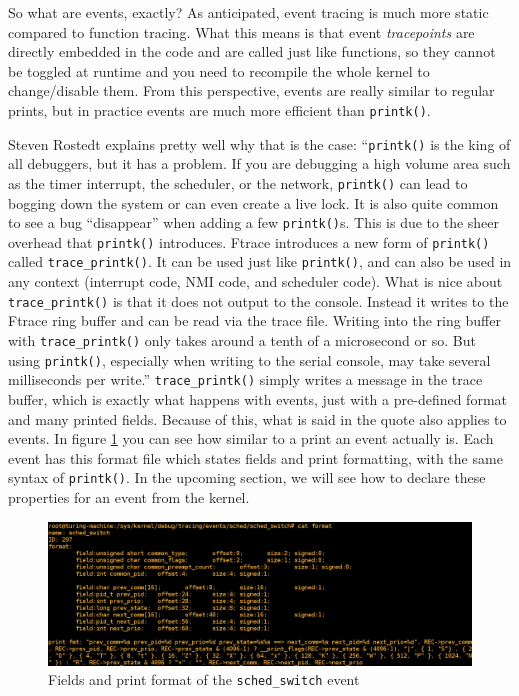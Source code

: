 So what are events, exactly? As anticipated, event tracing is much more static compared to function tracing. What this means is that event \textit{tracepoints} are directly embedded in the code and are called just like functions, so they cannot be toggled at runtime and you need to recompile the whole kernel to change/disable them. From this perspective, events are really similar to regular prints, but in practice events are much more efficient than \verb|printk()|. 

Steven Rostedt explains pretty well why that is the case: 
``\verb|printk()| is the king of all debuggers, but it has a problem. If you are debugging a high volume area such as the timer interrupt, the scheduler, or the network, \verb|printk()| can lead to bogging down the system or can even create a live lock. It is also quite common to see a bug ``disappear'' when adding a few \verb|printk()|s. This is due to the sheer overhead that \verb|printk()| introduces. Ftrace introduces a new form of \verb|printk()| called \verb|trace_printk()|. It can be used just like \verb|printk()|, and can also be used in any context (interrupt code, NMI code, and scheduler code). What is nice about \verb|trace_printk()| is that it does not output to the console. Instead it writes to the Ftrace ring buffer and can be read via the trace file. Writing into the ring buffer with \verb|trace_printk()| only takes around a tenth of a microsecond or so. But using \verb|printk()|, especially when writing to the serial console, may take several milliseconds per write.''\cite{trace_debugging} \verb|trace_printk()| simply writes a message in the trace buffer, which is exactly what happens with events, just with a pre-defined format and many printed fields. Because of this, what is said in the quote also applies to events. In figure \ref{img:sched_event_format} you can see how similar to a print an event actually is. Each event has this format file which states fields and print formatting, with the same syntax of \verb|printk()|. In the upcoming section, we will see how to declare these properties for an event from the kernel.

\begin{figure}[ht]
\includegraphics[width=\textwidth]{images/shell_sched_event_format.png} 
\caption{Fields and print format of the \texttt{sched\_switch} event}
\label{img:sched_event_format}
\end{figure}


